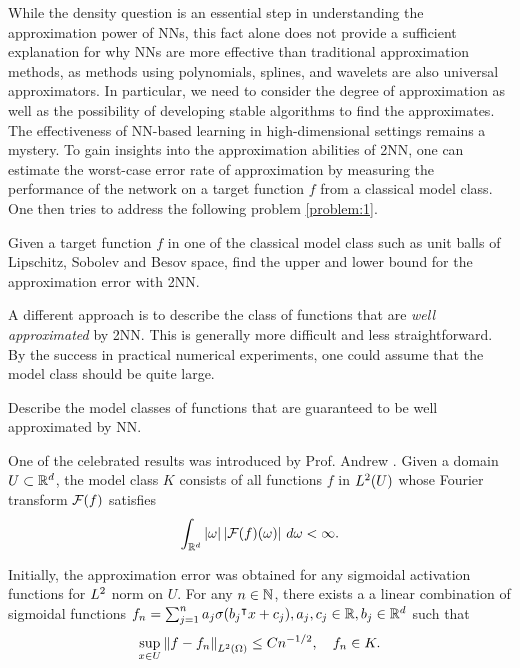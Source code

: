 
While the density question is an essential step in understanding the
approximation power of NNs, this fact alone does not provide a sufficient
explanation for why NNs are more effective than traditional approximation
methods, as methods using polynomials, splines, and wavelets are also universal
approximators. In particular, we need to consider the degree of approximation as
well as the possibility of developing stable algorithms to find the
approximates. The effectiveness of NN-based learning in high-dimensional
settings remains a mystery. To gain insights into the approximation abilities of
2NN, one can estimate the worst-case error rate of approximation by measuring
the performance of the network on a target function $f$ from a classical model
class. One then tries to address the following problem \ref{problem:1}.
\begin{problem}
    \label{problem:1}
    Given a target function $f$ in one of the classical model class such as unit
    balls of Lipschitz, Sobolev and Besov space, find the upper and lower bound
    for the approximation error with 2NN. 
\end{problem}


A different approach is to describe the class of functions that are \textit{well
approximated} by 2NN. This is generally more difficult and less straightforward.
By the success in practical numerical experiments, one could assume that the
model class should be quite large.
\begin{problem}
    \label{problem:2}
    Describe the model classes of functions that are guaranteed to be well
    approximated by NN.
\end{problem}


One of the celebrated results was introduced by Prof. Andrew
\cite{barronApproximationEstimationBounds1994}. Given a domain $U \subset \mathbb{R}^d$,
the model class $K$ consists of all functions $f$ in $L^{2}(U)$ whose Fourier
transform $\mathcal{F}(f)$ satisfies
\begin{equation}
    \int_{\mathbb{R}^d} \left| \omega \right| \left| \mathcal{F}(f)(\omega) \right| \,d\omega < \infty.
\end{equation}

Initially, the approximation error was obtained for any sigmoidal activation
functions for $L^{2}$ norm on $U$. For any $n \in \mathbb{N}$, there exists a a
linear combination of sigmoidal functions $f_n = \sum_{j=1}^n a_j \sigma(b_j{}^{\intercal}
x + c_j), a_j,c_j \in \mathbb{R}, b_j \in \mathbb{R}^d$ such that 
\begin{equation}
    \sup_{x \in U} \left\| f - f_n \right\|_{L^{2}(\Omega)} \leq C n^{-1/2}, \quad 
    f_n \in K.
\end{equation}

